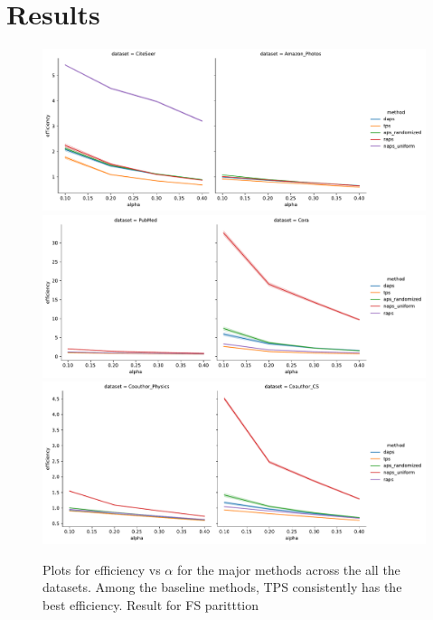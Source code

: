 
\section{Results}


\begin{figure}
    \centering
    \includegraphics[width=\linewidth,alt={Line plots showing method comparisons for small datasets.}]{graphConformal/figures/split/small_datasets_efficiency.pdf}
    \includegraphics[width=\linewidth,alt={Line plots showing method comparisons for Medium datasets.}]{graphConformal/figures/split/med_1_datasets_efficiency.pdf}
    \includegraphics[width=\linewidth,alt={Line plots showing method comparisons for large datasets.}]{graphConformal/figures/split/med_2_datasets_efficiency.pdf}
    \caption{Plots for efficiency vs $\alpha$ for the major methods across the all the datasets. Among the baseline methods, TPS consistently has the best efficiency. Result for FS paritttion}
    \label{fig:fs:conformal:efficiency_vs_alpha}
\end{figure}


